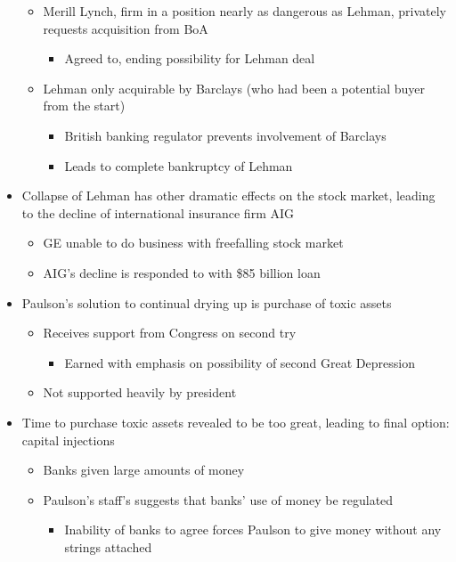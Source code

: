 \documentclass{article}
\begin{document}
\begin{itemize}
\begin{itemize}
\begin{itemize}
            \end{itemize}
            \item Merill Lynch, firm in a position nearly as dangerous as Lehman, privately requests acquisition from BoA 
            \begin{itemize}
                \item Agreed to, ending possibility for Lehman deal
            \end{itemize}
            \item Lehman only acquirable by Barclays (who had been a potential buyer from the start)
            \begin{itemize}
                \item British banking regulator prevents involvement of Barclays
                \item Leads to complete bankruptcy of Lehman
            \end{itemize}
        \end{itemize}
        \item Collapse of Lehman has other dramatic effects on the stock market, leading to the decline of international insurance firm AIG
        \begin{itemize}
            \item GE unable to do business with freefalling stock market
            \item AIG's decline is responded to with \$85 billion loan 
        \end{itemize}
        \item Paulson's solution to continual drying up is purchase of toxic assets
        \begin{itemize}
            \item Receives support from Congress on second try
            \begin{itemize}
                \item Earned with emphasis on possibility of second Great Depression
            \end{itemize}
            \item Not supported heavily by president
        \end{itemize}
        \item Time to purchase toxic assets revealed to be too great, leading to final option: capital injections 
        \begin{itemize}
            \item Banks given large amounts of money
            \item Paulson's staff's suggests that banks' use of money be regulated
            \begin{itemize}
                \item Inability of banks to agree forces Paulson to give money without any strings attached
            \end{itemize}
        \end{itemize}
    \end{itemize}
    
\end{document}
